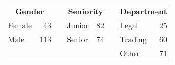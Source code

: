 
\begin{tabular}{lrclrclr}
    \toprule
    \multicolumn{2}{c}{\textbf{Gender}}
    & & \multicolumn{2}{c}{\textbf{Seniority}}
    & & \multicolumn{2}{c}{\textbf{Department}} \\
    \cmidrule{1-2} \cmidrule{4-5} \cmidrule{7-8}
    Female&43&&Junior&82&&Legal&25\\
    Male&113&&Senior&74&&Trading&60\\
    &&&&&&Other&71\\
    \bottomrule
\end{tabular}
